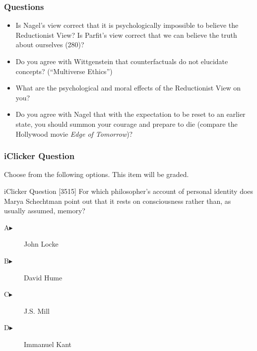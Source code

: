 \documentclass[xcolor=dvipsnames]{beamer}
\begin{document}
\begin{frame}
  \frametitle{Questions}
  \begin{itemize}
  \item Is Nagel's view correct that it is psychologically impossible
    to believe the Reductionist View? Is Parfit's view correct that we
    can believe the truth about ourselves (280)?
  \item Do you agree with Wittgenstein that counterfactuals do not
    elucidate concepts? (``Multiverse Ethics'')
  \item What are the psychological and moral effects of the
    Reductionist View on you?
  \item Do you agree with Nagel that with the expectation to be reset
    to an earlier state, you should summon your courage and prepare to
    die (compare the Hollywood movie \emph{Edge of Tomorrow})?
  \end{itemize}
\end{frame}

\begin{frame}
  \frametitle{iClicker Question}
Choose from the following options. This item will be graded.
\begin{block}{iClicker Question}
[3515] For which philosopher's account of personal identity does Marya
Schechtman point out that it rests on consciousness rather than, as
usually assumed, memory?
\end{block}
\begin{description}
\item[A\hspace{.2in}$\blacktriangleright$] John Locke
\item[B\hspace{.2in}$\blacktriangleright$] David Hume
\item[C\hspace{.2in}$\blacktriangleright$] J.S. Mill
\item[D\hspace{.2in}$\blacktriangleright$] Immanuel Kant
\end{description}
\end{frame}
\end{document}
